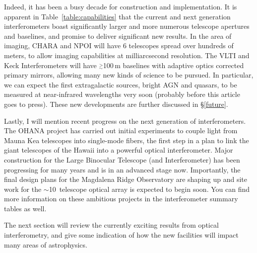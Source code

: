 \documentclass[12pt]{article}
\newcommand{\simge}{\mbox{$\stackrel{>}{_{\sim}}$}}
\begin{document}
Indeed, it has been a busy decade for construction and implementation.
It is apparent in Table~\ref{table:capabilities}  that
the current and next generation interferometers boast
significantly larger and more numerous telescope apertures and
baselines, and promise to deliver significant new results.  In the
area of imaging, CHARA and NPOI will have 6 telescopes spread over
hundreds of meters, to allow imaging capabilities at milliarcsecond
resolution.  The VLTI and Keck Interferometers will have
$\simge$100\,m baselines with adaptive optics corrected primary
mirrors, allowing many new kinds of science to be pursued. In
particular, we can expect the first extragalactic sources, bright AGN
and quasars, to be measured at near-infrared wavelengths very soon
(probably before this article goes to press).  These new developments
are further discussed in \S\ref{future}.

Lastly, I will mention recent progress on the next generation of
interferometers.  The OHANA project has carried out initial
experiments to couple light from Mauna Kea telescopes into single-mode
fibers, the first step in a plan to link the giant telescopes of the
Hawaii into a powerful optical interferometer.  Major construction for
the Large Binocular Telescope (and Interferometer) has been
progressing for many years and is in an advanced stage now.
Importantly, the final design plans for the Magdalena Ridge
Observatory are shaping up and site work for the $\sim$10~telescope
optical array is expected to begin soon.  You can find more
information on these ambitious projects in the interferometer summary
tables as well.

The next section will review the currently exciting results from
optical interferometry, and give some indication of how the new
facilities will impact many areas of astrophysics.
\end{document}
